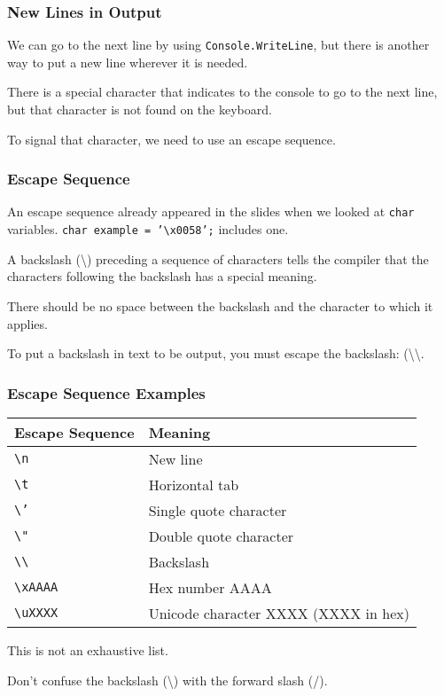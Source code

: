\begin{frame}
\frametitle{New Lines in Output}
We can go to the next line by using \texttt{Console.WriteLine}, but there is another way to put a new line wherever it is needed.

There is a special character that indicates to the console to go to the next line, but that character is not found on the keyboard.

To signal that character, we need to use an \alert{escape sequence}.

\end{frame}

\begin{frame}
\frametitle{Escape Sequence}
An escape sequence already appeared in the slides when we looked at \texttt{char} variables. \texttt{char example = '\textbackslash x0058';} includes one.

A backslash (\textbackslash) preceding a sequence of characters tells the compiler that the characters following the backslash has a special meaning.

There should be no space between the backslash and the character to which it applies.

To put a backslash in text to be output, you must escape the backslash: (\textbackslash\textbackslash.

\end{frame}

\begin{frame}
\frametitle{Escape Sequence Examples}
\begin{center}
\begin{tabular}{l|l}
	\textbf{Escape Sequence} & \textbf{Meaning} \\ \hline
	\texttt{\textbackslash n} & New line \\ \hline
	\texttt{\textbackslash t} & Horizontal tab \\ \hline
	\texttt{\textbackslash '} & Single quote character \\ \hline
	\texttt{\textbackslash "} & Double quote character \\ \hline
	\texttt{\textbackslash\textbackslash} & Backslash \\ \hline
	\texttt{\textbackslash xAAAA} & Hex number AAAA \\ \hline
	\texttt{\textbackslash uXXXX} & Unicode character XXXX (XXXX in hex)\\
	
\end{tabular}
\end{center}

This is not an exhaustive list.

Don't confuse the backslash (\textbackslash) with the forward slash (/).

\end{frame}

